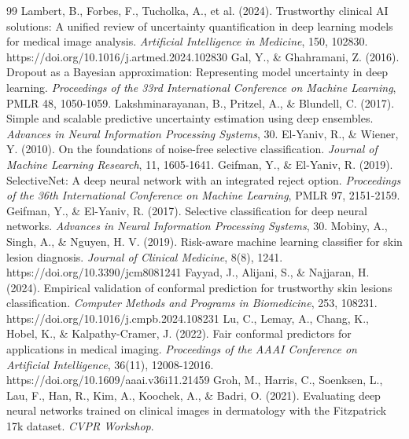\documentclass[11pt,a4paper]{article}
\begin{document}
\begin{thebibliography}{99}
 Lambert, B., Forbes, F., Tucholka, A., et al. (2024). Trustworthy clinical AI solutions: A unified review of uncertainty quantification in deep learning models for medical image analysis. \textit{Artificial Intelligence in Medicine}, 150, 102830. https://doi.org/10.1016/j.artmed.2024.102830
 Gal, Y., \& Ghahramani, Z. (2016). Dropout as a Bayesian approximation: Representing model uncertainty in deep learning. \textit{Proceedings of the 33rd International Conference on Machine Learning}, PMLR 48, 1050-1059.
 Lakshminarayanan, B., Pritzel, A., \& Blundell, C. (2017). Simple and scalable predictive uncertainty estimation using deep ensembles. \textit{Advances in Neural Information Processing Systems}, 30.
 El-Yaniv, R., \& Wiener, Y. (2010). On the foundations of noise-free selective classification. \textit{Journal of Machine Learning Research}, 11, 1605-1641.
 Geifman, Y., \& El-Yaniv, R. (2019). SelectiveNet: A deep neural network with an integrated reject option. \textit{Proceedings of the 36th International Conference on Machine Learning}, PMLR 97, 2151-2159.
 Geifman, Y., \& El-Yaniv, R. (2017). Selective classification for deep neural networks. \textit{Advances in Neural Information Processing Systems}, 30.
 Mobiny, A., Singh, A., \& Nguyen, H. V. (2019). Risk-aware machine learning classifier for skin lesion diagnosis. \textit{Journal of Clinical Medicine}, 8(8), 1241. https://doi.org/10.3390/jcm8081241
 Fayyad, J., Alijani, S., \& Najjaran, H. (2024). Empirical validation of conformal prediction for trustworthy skin lesions classification. \textit{Computer Methods and Programs in Biomedicine}, 253, 108231. https://doi.org/10.1016/j.cmpb.2024.108231
 Lu, C., Lemay, A., Chang, K., Hobel, K., \& Kalpathy-Cramer, J. (2022). Fair conformal predictors for applications in medical imaging. \textit{Proceedings of the AAAI Conference on Artificial Intelligence}, 36(11), 12008-12016. https://doi.org/10.1609/aaai.v36i11.21459
 Groh, M., Harris, C., Soenksen, L., Lau, F., Han, R., Kim, A., Koochek, A., \& Badri, O. (2021). Evaluating deep neural networks trained on clinical images in dermatology with the Fitzpatrick 17k dataset. \textit{CVPR Workshop}.

\end{thebibliography}
\end{document}
